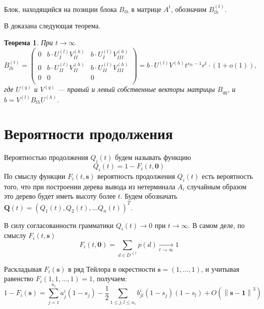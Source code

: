 \documentclass[12pt]{article}
\renewcommand{\leq}{\leqslant}
\newtheorem{theorem}{Теорема}
\begin{document}
{Блок, находящийся на позиции блока $B_{lh}$ в матрице $A^t$, обозначим $B^{(t)}_{lh}$.

В \cite{zhiltsova-about-matrix} доказана следующая теорема.
\begin{theorem}
	При $t \rightarrow \infty$
	\begin{equation*}
		B^{(t)}_{lh} = 
		\begin{pmatrix}
			0 & b \cdot U^{(l)}_I V^{(h)}_{II}    & b \cdot U^{(l)}_I V^{(h)}_{III} \\
			0 & b \cdot U^{(l)}_{II} V^{(h)}_{II} & b \cdot U^{(l)}_{II} V^{(h)}_{III} \\
			0 & 0 & 0 \\
		\end{pmatrix} =
		b \cdot U^{(l)} V^{(h)} t^{s_{lh} - 1} r^t \cdot (1 + o(1)),
	\end{equation*}
	где $U^{(q)}$ и $V^{(q)}$ --- правый и левый собственные векторы матрицы $B_{qq}$, и $b = V^{(l)} B_{lh} U^{(h)}$.
\end{theorem}

\section{Вероятности продолжения}

Вероятностью продолжения $Q_i(t)$ будем называть функцию
\begin{equation*}
	Q_i(t) = 1 - F_i(t, \mathbf{0})
\end{equation*}
По смыслу функции $F_i(t, \mathbf{s})$ вероятность продолжения $Q_i(t)$ есть вероятность того, что при построении дерева вывода из нетерминала $A_i$ случайным образом это дерево будет иметь высоту более $t$. Будем обозначать $\mathbf{Q}(t) = (Q_1(t), Q_2(t), \ldots Q_n(t))^T$.

В силу согласованности грамматики $Q_i(t) \rightarrow 0$ при $t \rightarrow \infty$. В самом деле, по смыслу $F_i(t, \mathbf{s})$
\begin{equation*}
	F_i(t, \mathbf{0}) = \sum_{d \in D^{\leq t}} p(d) \xrightarrow[t \rightarrow \infty]{} 1
\end{equation*}

Раскладывая $F_i(\mathbf{s})$ в ряд Тейлора в окрестности $\mathbf{s} = (1, \ldots, 1)$, и учитывая равенство $F_i(1, 1, \ldots, 1) = 1$, получаем:
\begin{equation}
	1 - F_i(\mathbf{s}) = \sum_{j = 1}^{n_i} a^i_j(1 - s_j) - \frac{1}{2} \sum_{1 \leq j,l \leq n_i} b^i_{jl} (1 - s_j) (1 - s_l) + O\left( \left\| \mathbf{s} - \mathbf{1} \right\| ^3 \right)
\end{equation}

}
\end{document}
